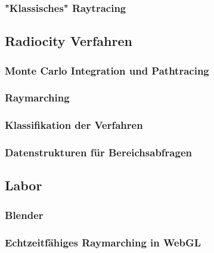 \subsubsection{"Klassisches" Raytracing}
\subsection{Radiocity Verfahren}
\subsubsection{Monte Carlo Integration und Pathtracing}
\subsubsection{Raymarching}
\subsubsection{Klassifikation der Verfahren}

\subsubsection{Datenstrukturen für Bereichsabfragen}


\subsection{Labor}
\subsubsection{Blender}
\subsubsection{Echtzeitfähiges Raymarching in WebGL}
